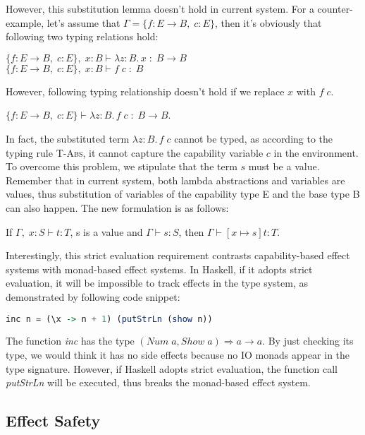 However, this substitution lemma doesn't hold in current system. For a
counter-example, let's assume that $\Gamma = \{f: E \to B,\; c:E\}$,
then it's obviously that following two typing relations hold:

$\{f: E \to B,\; c:E\},\; x:B \vdash \lambda z:B.\,x \; : \; B \to
  B$ \\
$\{f: E \to B,\; c:E\},\; x:B \vdash f \; c \; : \; B$

However, following typing relationship doesn't hold if we replace
$x$ with $f \; c$.

$\{f: E \to B,\; c:E\} \vdash \lambda z:B.\,f \; c \; : \; B \to B$.

In fact, the substituted term $\lambda z:B.\,f \; c$ cannot be typed,
as according to the typing rule \textsc{T-Abs}, it cannot capture the
capability variable $c$ in the environment. To overcome this problem,
we stipulate that the term $s$ must be a value. Remember that in
current system, both lambda abstractions and variables are values,
thus substitution of variables of the capability type E and the base
type B can also happen. The new formulation is as follows:

\begin{lemma}
  If $\Gamma,\; x:S \vdash t : T$, s is a value and
  $\Gamma \vdash s : S$, then $\Gamma \vdash [x \mapsto s]t : T$.
\end{lemma}

Interestingly, this strict evaluation requirement contrasts
capability-based effect systems with monad-based effect systems. In
Haskell, if it adopts strict evaluation, it will be impossible to
track effects in the type system, as demonstrated by following code
snippet:

\begin{lstlisting}[language=Haskell]
  inc n = (\x -> n + 1) (putStrLn (show n))
\end{lstlisting}

The function \emph{inc} has the type
$(Num\;a, Show\;a) \Rightarrow a \to a$. By just checking its type, we
would think it has no side effects because no IO monads appear in the
type signature. However, if Haskell adopts strict evaluation, the
function call \emph{putStrLn} will be executed, thus breaks the
monad-based effect system.

\subsection{Effect Safety}

